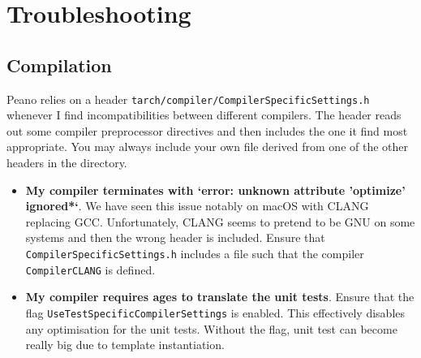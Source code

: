 \chapter{Troubleshooting}

% 





\section{Compilation}

Peano relies on a header \texttt{tarch/compiler/CompilerSpecificSettings.h}
whenever I find incompatibilities between different compilers. 
The header reads out some compiler preprocessor directives and then includes the
one it find most appropriate. 
You may always include your own file derived from one of the other headers in
the directory.


\begin{itemize}
  \item \textbf{ My compiler terminates with `error: unknown
   attribute 'optimize' ignored*`}. We have seen this issue notably on macOS
   with CLANG replacing GCC. Unfortunately, CLANG seems to pretend to be GNU on
   some systems and then the wrong header is included. Ensure that
   \texttt{CompilerSpecificSettings.h} includes a file such that the compiler
   \linebreak
   \texttt{CompilerCLANG} is defined.
  \item \textbf{ My compiler requires ages to translate the unit tests}. Ensure
  that the flag \linebreak \texttt{UseTestSpecificCompilerSettings} is enabled.
  This effectively disables any optimisation for the unit tests. Without the
  flag, unit test can become really big due to template instantiation.
\end{itemize}




